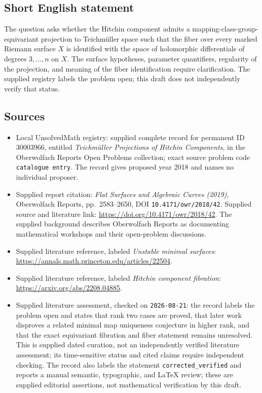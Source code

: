 \documentclass[11pt]{article}
\begin{document}
\subsection{Short English statement}
The question asks whether the Hitchin component admits a mapping-class-group-equivariant projection to Teichm\"uller space such that the fiber over every marked Riemann surface \(X\) is identified with the space of holomorphic differentials of degrees \(3,\ldots,n\) on \(X\). The surface hypotheses, parameter quantifiers, regularity of the projection, and meaning of the fiber identification require clarification. The supplied registry labels the problem open; this draft does not independently verify that status.
\subsection{Sources}
\begin{itemize}
\item Local UnsolvedMath registry: supplied complete record for permanent ID \(30003966\), entitled \emph{Teichm\"uller Projections of Hitchin Components}, in the Oberwolfach Reports Open Problems collection; exact source problem code \texttt{catalogue entry}. The record gives proposed year 2018 and names no individual proposer.
\item Supplied report citation: \emph{Flat Surfaces and Algebraic Curves (2019)}, Oberwolfach Reports, pp.\ 2583--2650, DOI \texttt{10.4171/owr/2018/42}. Supplied source and literature link: \url{https://doi.org/10.4171/owr/2018/42}. The supplied background describes Oberwolfach Reports as documenting mathematical workshops and their open-problem discussions.
\item Supplied literature reference, labeled \emph{Unstable minimal surfaces}: \url{https://annals.math.princeton.edu/articles/22504}.
\item Supplied literature reference, labeled \emph{Hitchin component fibration}: \url{https://arxiv.org/abs/2208.04885}.
\item Supplied literature assessment, checked on \texttt{2026-08-21}: the record labels the problem open and states that rank two cases are proved, that later work disproves a related minimal map uniqueness conjecture in higher rank, and that the exact equivariant fibration and fiber statement remains unresolved. This is supplied dated curation, not an independently verified literature assessment; its time-sensitive status and cited claims require independent checking. The record also labels the statement \texttt{corrected\_verified} and reports a manual semantic, typographic, and LaTeX review; these are supplied editorial assertions, not mathematical verification by this draft.
\end{itemize}
\end{document}

